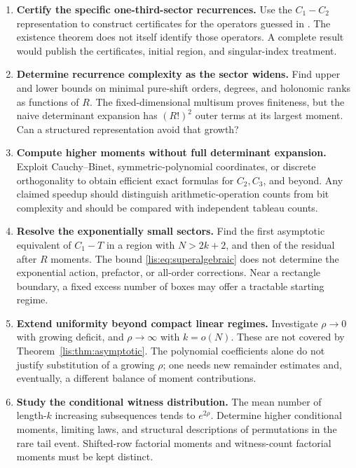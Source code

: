 \documentclass[11pt,letterpaper]{article}
\numberwithin{equation}{section}
\theoremstyle{definition}
\begin{document}
\begin{enumerate}[leftmargin=*,itemsep=8pt]
\item \textbf{Certify the specific one-third-sector recurrences.}
Use the $C_1-C_2$ representation to construct certificates for the
operators guessed in \cite{KW}. The existence theorem does not itself
identify those operators. A complete result would publish the
certificates, initial region, and singular-index treatment.

\item \textbf{Determine recurrence complexity as the sector widens.}
Find upper and lower bounds on minimal pure-shift orders, degrees, and
holonomic ranks as functions of $R$. The fixed-dimensional multisum
proves finiteness, but the naive determinant expansion has $(R!)^2$
outer terms at its largest moment. Can a structured representation
avoid that growth?

\item \textbf{Compute higher moments without full determinant expansion.}
Exploit Cauchy--Binet, symmetric-polynomial coordinates, or discrete
orthogonality to obtain efficient exact formulas for $C_2,C_3$, and
beyond. Any claimed speedup should distinguish arithmetic-operation
counts from bit complexity and should be compared with independent
tableau counts.

\item \textbf{Resolve the exponentially small sectors.}
Find the first asymptotic equivalent of $C_1-T$ in a region with
$N>2k+2$, and then of the residual after $R$ moments. The bound
\eqref{lis:eq:superalgebraic} does not determine the exponential action,
prefactor, or all-order corrections. Near a rectangle boundary, a
fixed excess number of boxes may offer a tractable starting regime.

\item \textbf{Extend uniformity beyond compact linear regimes.}
Investigate $\rho\to0$ with growing deficit, and $\rho\to\infty$ with
$k=o(N)$. These are not covered by Theorem~\ref{lis:thm:asymptotic}.
The polynomial coefficients alone do not justify substitution of a
growing $\rho$; one needs new remainder estimates and, eventually,
a different balance of moment contributions.

\item \textbf{Study the conditional witness distribution.}
The mean number of length-$k$ increasing subsequences tends to
$e^{2\rho}$. Determine higher conditional moments, limiting laws,
and structural descriptions of permutations in the rare tail event.
Shifted-row factorial moments and witness-count factorial moments
must be kept distinct.


\end{enumerate}
\end{document}
